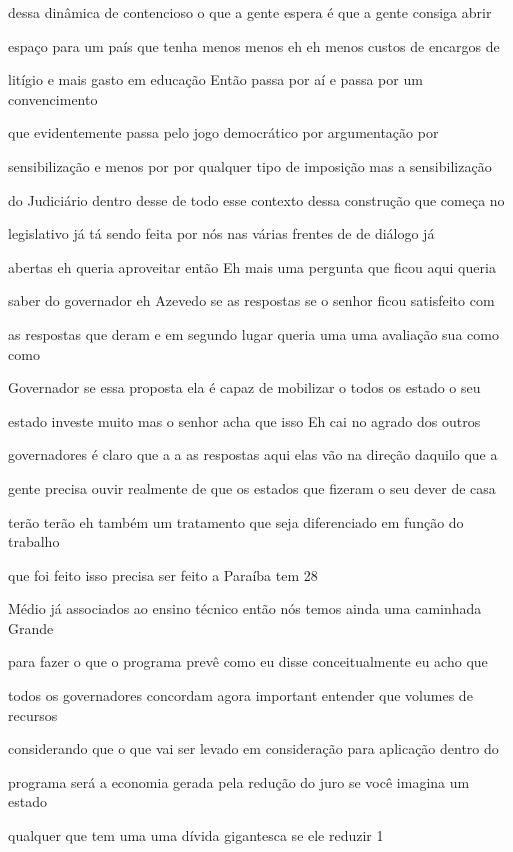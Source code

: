 \documentclass[a4paper,12pt]{article}
\begin{document}
dessa dinâmica de contencioso o que a gente espera é que a gente consiga abrir

espaço para um país que tenha menos menos eh eh menos custos de encargos de

litígio e mais gasto em educação Então passa por aí e passa por um convencimento

que evidentemente passa pelo jogo democrático por argumentação por

sensibilização e menos por por qualquer tipo de imposição mas a sensibilização

do Judiciário dentro desse de todo esse contexto dessa construção que começa no

legislativo já tá sendo feita por nós nas várias frentes de de diálogo já

abertas eh queria aproveitar então Eh mais uma pergunta que ficou aqui queria

saber do governador eh Azevedo se as respostas se o senhor ficou satisfeito com

as respostas que deram e em segundo lugar queria uma uma avaliação sua como como

Governador se essa proposta ela é capaz de mobilizar o todos os estado o seu

estado investe muito mas o senhor acha que isso Eh cai no agrado dos outros

governadores é claro que a a as respostas aqui elas vão na direção daquilo que a

gente precisa ouvir realmente de que os estados que fizeram o seu dever de casa

terão terão eh também um tratamento que seja diferenciado em função do trabalho

que foi feito isso precisa ser feito a Paraíba tem 28%

Médio já associados ao ensino técnico então nós temos ainda uma caminhada Grande

para fazer o que o programa prevê como eu disse conceitualmente eu acho que

todos os governadores concordam agora important entender que volumes de recursos

considerando que o que vai ser levado em consideração para aplicação dentro do

programa será a economia gerada pela redução do juro se você imagina um estado

qualquer que tem uma uma dívida gigantesca se ele reduzir 1%
\end{document}
